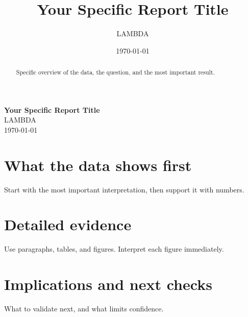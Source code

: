 \documentclass[11pt,a4paper]{article}
\title{Your Specific Report Title}
\author{LAMBDA}
\date{\today}
\begin{document}
\thispagestyle{firstpage}

\begin{center}
  \vspace*{3cm}
  {\LARGE \textbf{Your Specific Report Title}} \\[0.5em]
  {\large LAMBDA} \\[0.5em]
  {\large \today}
\end{center}

\begin{abstract}
Specific overview of the data, the question, and the most important result.
\end{abstract}

\newpage

\section{What the data shows first}
Start with the most important interpretation, then support it with numbers.

\section{Detailed evidence}
Use paragraphs, tables, and figures. Interpret each figure immediately.

\section{Implications and next checks}
What to validate next, and what limits confidence.
\end{document}
